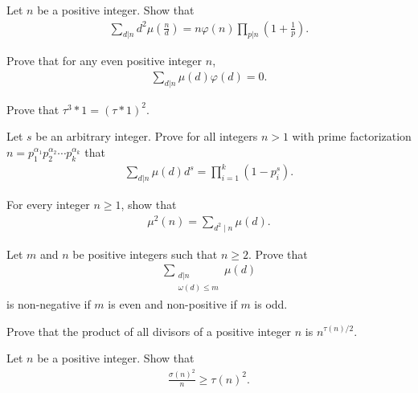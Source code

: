 \documentclass[12pt]{subfile}
\begin{document}
	\begin{problem}
		Let $n$ be a positive integer. Show that
			\begin{align*}
				\sum_{d|n} d^2 \mu\left(\frac{n}{d}\right) = n \varphi(n) \prod_{p|n} \left(1+ \frac{1}{p}\right).
			\end{align*}
	\end{problem}
	
	\begin{problem}
		Prove that for any even positive integer $n$,
			\begin{align*}
				\sum_{d|n} \mu(d)\varphi(d) = 0.
			\end{align*}
	\end{problem}
	
	\begin{problem}
		Prove that $\tau^3 \ast 1 = (\tau\ast 1)^2$.
	\end{problem}
	
	\begin{problem}
		Let $s$ be an arbitrary integer. Prove for all integers $n >1$ with prime factorization $n= p_1^{\alpha_1} p_2^{\alpha_2} \cdots p_k^{\alpha_k}$ that
			\begin{align*}
			\sum_{d|n} \mu (d) d^s = \prod_{i=1}^{k} (1-p_i^s).
			\end{align*}
	\end{problem}
	
	\begin{problem}
		For every integer $n \geq 1$, show that
			\begin{align*}
				\mu^2(n)=\sum_{d^2\mid n}\mu(d).
			\end{align*}
	\end{problem}
	
	\begin{problem}
		Let $m$ and $n$ be positive integers such that $n \geq 2$. Prove that
			\begin{align*}
				\sum\limits_{\substack{d|n \\ \omega(d) \leq m}} \mu(d)
			\end{align*}
		is non-negative if $m$ is even and non-positive if $m$ is odd.
	\end{problem}
	
	\begin{problem}
		Prove that the product of all divisors of a positive integer $n$ is $n^{\tau(n)/2}$.
	\end{problem}
	\begin{problem}
		Let $n$ be a positive integer. Show that
			\begin{align*}
				\frac{\sigma(n)^2}{n} \geq \tau(n)^2.
			\end{align*}
	\end{problem}
	
\end{document}
